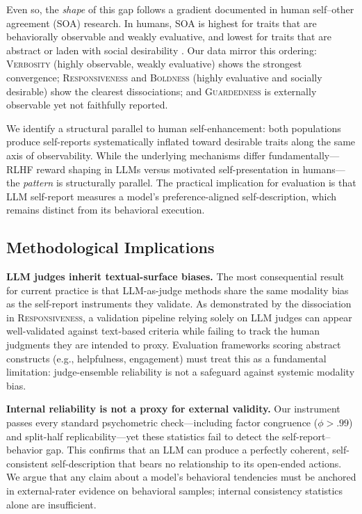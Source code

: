 \documentclass[11pt]{article}
\newcommand{\factorname}[1]{\textsc{#1}}
\begin{document}
Even so, the \emph{shape} of this gap follows a gradient documented in human self--other agreement (SOA) research. In humans, SOA is highest for traits that are behaviorally observable and weakly evaluative, and lowest for traits that are abstract or laden with social desirability \citep{funder1995accuracy, vazire2010who}. Our data mirror this ordering: \factorname{Verbosity} (highly observable, weakly evaluative) shows the strongest convergence; \factorname{Responsiveness} and \factorname{Boldness} (highly evaluative and socially desirable) show the clearest dissociations; and \factorname{Guardedness} is externally observable yet not faithfully reported.

We identify a structural parallel to human self-enhancement: both populations produce self-reports systematically inflated toward desirable traits along the same axis of observability. While the underlying mechanisms differ fundamentally---RLHF reward shaping in LLMs versus motivated self-presentation in humans---the \emph{pattern} is structurally parallel. The practical implication for evaluation is that LLM self-report measures a model's preference-aligned self-description, which remains distinct from its behavioral execution.

\subsection{Methodological Implications}
\label{sec:discussion-methods}

\textbf{LLM judges inherit textual-surface biases.}
The most consequential result for current practice is that LLM-as-judge methods share the same modality bias as the self-report instruments they validate. As demonstrated by the dissociation in \factorname{Responsiveness}, a validation pipeline relying solely on LLM judges can appear well-validated against text-based criteria while failing to track the human judgments they are intended to proxy. Evaluation frameworks scoring abstract constructs (e.g., helpfulness, engagement) must treat this as a fundamental limitation: judge-ensemble reliability is not a safeguard against systemic modality bias.

\textbf{Internal reliability is not a proxy for external validity.}
Our instrument passes every standard psychometric check---including factor congruence ($\phi > .99$) and split-half replicability---yet these statistics fail to detect the self-report--behavior gap. This confirms that an LLM can produce a perfectly coherent, self-consistent self-description that bears no relationship to its open-ended actions. We argue that any claim about a model's behavioral tendencies must be anchored in external-rater evidence on behavioral samples; internal consistency statistics alone are insufficient.
\end{document}
